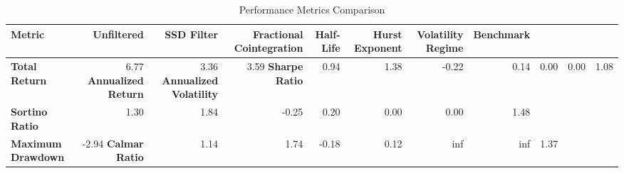\begin{table}[ht]
\centering[ht]
\caption{Performance Metrics Comparison}
\label{tab:performance_metrics}
\begin{tabular}{lrrrrrrr}
\toprule
\textbf{Metric}
 & Unfiltered & SSD Filter & Fractional Cointegration & Half-Life & Hurst Exponent & Volatility Regime & Benchmark \\
\midrule
\textbf{Total Return} & 6.77%
\textbf{Annualized Return} & 3.36%
\textbf{Annualized Volatility} & 3.59%
\textbf{Sharpe Ratio} & 0.94 & 1.38 & -0.22 & 0.14 & 0.00 & 0.00 & 1.08 \\
\textbf{Sortino Ratio} & 1.30 & 1.84 & -0.25 & 0.20 & 0.00 & 0.00 & 1.48 \\
\textbf{Maximum Drawdown} & -2.94%
\textbf{Calmar Ratio} & 1.14 & 1.74 & -0.18 & 0.12 & inf & inf & 1.37 \\
\bottomrule
\end{tabular}
\end{table}

